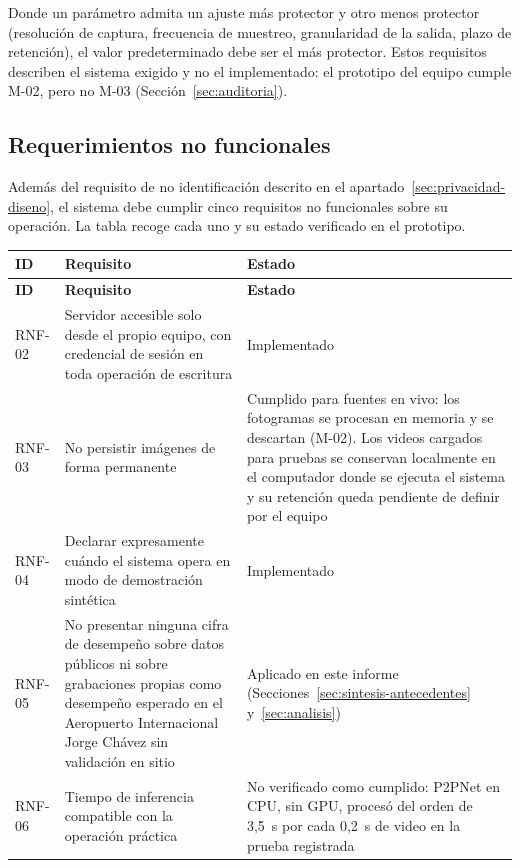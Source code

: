 Donde un parámetro admita un ajuste más protector y otro menos protector
(resolución de captura, frecuencia de muestreo, granularidad de la salida,
plazo de retención), el valor predeterminado debe ser el más protector.
Estos requisitos describen el sistema exigido y no el implementado: el
prototipo del equipo cumple M-02, pero no M-03
(Sección~\ref{sec:auditoria}).

\subsection{Requerimientos no funcionales}
\label{sec:req-no-funcionales}

Además del requisito de no identificación descrito en el
apartado~\ref{sec:privacidad-diseno}, el sistema debe cumplir cinco
requisitos no funcionales sobre su operación. La tabla recoge cada uno y
su estado verificado en el prototipo.

{\small
\setlength{\LTleft}{0pt}\setlength{\LTright}{0pt}
\begin{longtable}{@{}L{1.4cm}L{\dimexpr\linewidth-6.4cm-4\tabcolsep\relax}L{5.0cm}@{}}
\toprule
\textbf{ID} & \textbf{Requisito} & \textbf{Estado} \\
\midrule
\endfirsthead
\toprule
\textbf{ID} & \textbf{Requisito} & \textbf{Estado} \\
\midrule
\endhead
\bottomrule
\endlastfoot
RNF-02 & Servidor accesible solo desde el propio equipo, con credencial de
sesión en toda operación de escritura & Implementado \\
\addlinespace
RNF-03 & No persistir imágenes de forma permanente & Cumplido para
fuentes en vivo: los fotogramas se procesan en memoria y se descartan
(M-02). Los videos cargados para pruebas se conservan localmente en el
computador donde se ejecuta el sistema y su retención queda pendiente de
definir por el equipo \\
\addlinespace
RNF-04 & Declarar expresamente cuándo el sistema opera en modo de
demostración sintética & Implementado \\
\addlinespace
RNF-05 & No presentar ninguna cifra de desempeño sobre datos públicos ni
sobre grabaciones propias como desempeño esperado en el Aeropuerto
Internacional Jorge Chávez sin validación en sitio & Aplicado en este
informe (Secciones~\ref{sec:sintesis-antecedentes}
y~\ref{sec:analisis}) \\
\addlinespace
RNF-06 & Tiempo de inferencia compatible con la operación práctica & No
verificado como cumplido: P2PNet en CPU, sin GPU, procesó del orden de
3,5~s por cada 0,2~s de video en la prueba registrada \\
\end{longtable}
}
